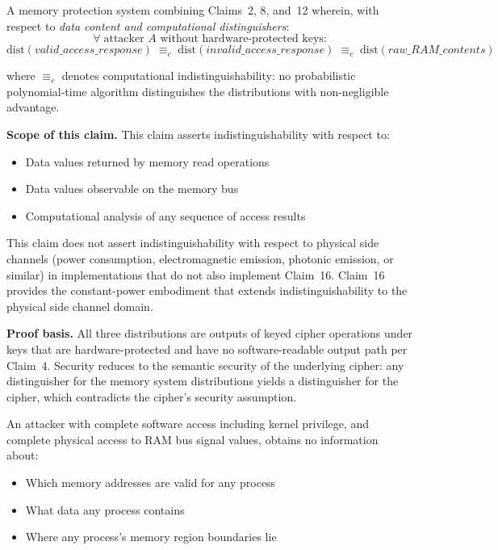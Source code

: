 \documentclass[12pt,letterpaper]{article}
\begin{document}
A memory protection system combining Claims~2, 8, and~12 wherein,
with respect to \emph{data content and computational distinguishers}:
\[
  \forall\; \text{attacker } A \text{ without hardware-protected keys:}
\]
\[
  \mathrm{dist}(\textit{valid\_access\_response})
  \;\equiv_c\;
  \mathrm{dist}(\textit{invalid\_access\_response})
  \;\equiv_c\;
  \mathrm{dist}(\textit{raw\_RAM\_contents})
\]

where $\equiv_c$ denotes computational indistinguishability: no
probabilistic polynomial-time algorithm distinguishes the distributions
with non-negligible advantage.

\textbf{Scope of this claim.}
This claim asserts indistinguishability with respect to:
\begin{itemize}[noitemsep]
  \item Data values returned by memory read operations
  \item Data values observable on the memory bus
  \item Computational analysis of any sequence of access results
\end{itemize}

This claim does not assert indistinguishability with respect to
physical side channels (power consumption, electromagnetic emission,
photonic emission, or similar) in implementations that do not also
implement Claim~16. Claim~16 provides the constant-power embodiment
that extends indistinguishability to the physical side channel domain.

\textbf{Proof basis.}
All three distributions are outputs of keyed cipher operations under
keys that are hardware-protected and have no software-readable output
path per Claim~4.
Security reduces to the semantic security of the underlying cipher:
any distinguisher for the memory system distributions yields a
distinguisher for the cipher, which contradicts the cipher's
security assumption.

An attacker with complete software access including kernel privilege,
and complete physical access to RAM bus signal values, obtains no
information about:
\begin{itemize}[noitemsep]
  \item Which memory addresses are valid for any process
  \item What data any process contains
  \item Where any process's memory region boundaries lie
\end{itemize}

\medskip
\end{document}
